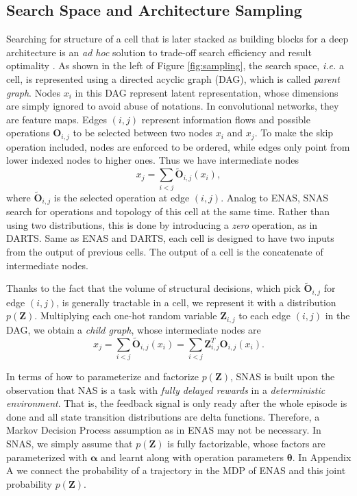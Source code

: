 \documentclass{article} \usepackage{iclr2019_conference,times}
\newcommand{\zh}{\color{black}}
\begin{document}
\subsection{Search Space and Architecture Sampling}
Searching for structure of a cell that is later stacked as building blocks for a deep architecture is an \textit{ad hoc} solution to trade-off search efficiency and result optimality \citep{zoph2017learning, liu2017progressive, real2018regularized, pham2018efficient, liu2018darts}. As shown in the left of Figure \ref{fig:sampling}, the search space, \textit{i.e.} a cell, is represented using a directed acyclic graph (DAG), which is called \textit{parent graph}. Nodes $x_{i}$ in this DAG represent latent representation{\zh ,} whose dimensions are simply ignored to avoid abuse of notations. In convolutional networks, they are feature maps. Edges $(i, j)$ represent information flows and possible operations $\bm{O}_{i, j}$ to be selected between two nodes $x_{i}$ and $x_{j}$. To make the skip operation included, nodes are enforced to be ordered, while edges only point from lower indexed nodes to higher ones. Thus we have intermediate nodes
\begin{equation}
x_{j} = \sum_{i<j} \tilde{\bm{O}}_{i, j}(x_{i}),
\label{eq:operation}
\end{equation}
where $\tilde{\bm{O}}_{i, j}$ is the selected operation at edge $(i, j)$. Analog to ENAS, SNAS search for operations and topology of this cell {\zh at} the same time. Rather than using two distributions, this is done by introducing a \textit{zero} operation, as in DARTS. Same as ENAS and DARTS, each cell is designed to have two inputs from the output of previous cells. The output of a cell is the concatenate of intermediate nodes.

Thanks to the fact that the volume of structural decisions, which pick $\tilde{\bm{O}}_{i, j}$ for edge $(i, j)$, is generally tractable in a cell, we represent it with a distribution $p(\bm{Z})$. Multiplying each one-hot random variable $\bm{Z}_{i, j}$ to each edge $(i, j)$ in the DAG, we obtain a \textit{child graph}, whose intermediate nodes are
 \begin{equation}
x_{j} = \sum_{i<j} \tilde{\bm{O}}_{i, j}(x_{i})= \sum_{i<j}\bm{Z}_{i,j}^{T}\bm{O}_{i, j}(x_{i}).
\end{equation}

In terms of how to parameterize and factorize $p(\bm{Z})$, SNAS is built upon the observation that NAS is a task with \textit{fully delayed rewards} in a \textit{deterministic environment}. That is, the feedback signal is only ready after the whole episode is done and all state transition distributions are delta functions. Therefore, a Markov Decision Process assumption as in ENAS may not be necessary. In SNAS, we simply assume that $p(\bm{Z})$ is fully factorizable, whose factors are parameterized with $\bm{\alpha}$ and learnt along with operation parameters $\bm{\theta}$. In Appendix A we connect the probability of a trajectory in the MDP of ENAS and this joint probability $p(\bm{Z})$. 
\end{document}
